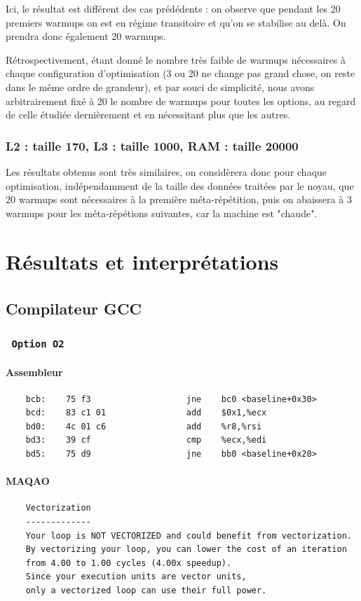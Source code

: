 \documentclass{report}
\begin{document}
	Ici, le résultat est différent des cas prédédents : on observe que pendant les 20 premiers warmups on est en régime transitoire et qu'on se stabilise au delà. On prendra donc également 20 warmups.

	Rétrospectivement, étant donné le nombre très faible de warmups nécessaires à chaque configuration d'optimisation (3 ou 20 ne change pas grand chose, on reste dans le même ordre de grandeur), et par souci de simplicité, nous avons arbitrairement fixé à 20 le nombre de warmups pour toutes les options, au regard de celle étudiée dernièrement et en nécessitant plus que les autres.

    \subsubsection{L2 : taille 170, L3 : taille 1000, RAM : taille 20000}
    Les résultats obtenus sont très similaires, on considèrera donc pour chaque optimisation, indépendamment de la taille des données traitées par le noyau, que 20 warmups sont nécessaires à la première méta-répétition, puis on abaissera à 3 warmups pour les méta-répétions suivantes, car la machine est "chaude".
\newpage
\section{Résultats et interprétations}
    \subsection{Compilateur GCC\textsuperscript \textcopyleft  }
      \subsubsection{ \texttt{ Option O2 } }
          \paragraph{Assembleur}
            \begin{tcolorbox}
              \begin{verbatim}
    bcb:	75 f3                	jne    bc0 <baseline+0x30>
    bcd:	83 c1 01             	add    $0x1,%ecx
    bd0:	4c 01 c6             	add    %r8,%rsi
    bd3:	39 cf                	cmp    %ecx,%edi
    bd5:	75 d9                	jne    bb0 <baseline+0x20>
            \end{verbatim}
          \end{tcolorbox}
          \paragraph{MAQAO}
            \begin{tcolorbox}
              \begin{verbatim}
    Vectorization
    -------------
    Your loop is NOT VECTORIZED and could benefit from vectorization.
    By vectorizing your loop, you can lower the cost of an iteration
    from 4.00 to 1.00 cycles (4.00x speedup).
    Since your execution units are vector units,
    only a vectorized loop can use their full power.
            \end{verbatim}
          \end{tcolorbox}
\end{document}
